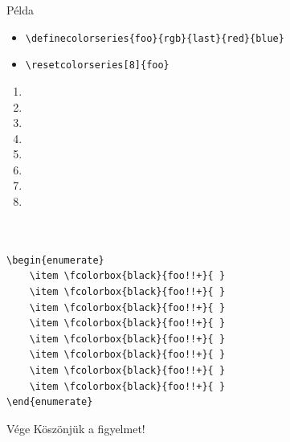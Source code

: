 \documentclass[aspectratio=1610, dvipsnames, xcolor=table]{beamer}
\begin{document}
    \begin{frame}[fragile]{Példa}
        \begin{minipage}{0.5\textwidth}
            \begin{itemize}
                \item {} \verb!\definecolorseries{foo}{rgb}{last}{red}{blue}!
                \item {} \verb!\resetcolorseries[8]{foo}!
            \end{itemize}
            

        


        
        \begin{enumerate}
            \item {}
            \item {}
            \item {}
            \item {}
            \item {}
            \item {}
            \item {}
            \item {}
        \end{enumerate}    
        \end{minipage}
        \begin{minipage}{0.45\textwidth}
            \begin{verbatim}


\begin{enumerate}
    \item \fcolorbox{black}{foo!!+}{ }
    \item \fcolorbox{black}{foo!!+}{ }
    \item \fcolorbox{black}{foo!!+}{ }
    \item \fcolorbox{black}{foo!!+}{ }
    \item \fcolorbox{black}{foo!!+}{ }
    \item \fcolorbox{black}{foo!!+}{ }
    \item \fcolorbox{black}{foo!!+}{ }
    \item \fcolorbox{black}{foo!!+}{ }
\end{enumerate}        
            \end{verbatim}
            
        \end{minipage}
    \end{frame}

    \begin{frame}{Vége}
        \centering \Huge Köszönjük a figyelmet!
    \end{frame}
\end{document}
